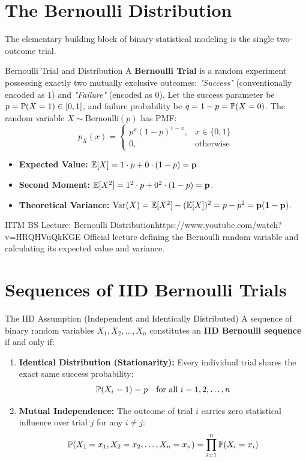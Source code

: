\section{The Bernoulli Distribution}

The elementary building block of binary statistical modeling is the single two-outcome trial.

\begin{definitionbox}{Bernoulli Trial and Distribution}
A \textbf{Bernoulli Trial} is a random experiment possessing exactly two mutually exclusive outcomes: \emph{"Success"} (conventionally encoded as $1$) and \emph{"Failure"} (encoded as $0$).
Let the success parameter be $p = \P(X = 1) \in [0, 1]$, and failure probability be $q = 1 - p = \P(X = 0)$.
The random variable $X \sim \text{Bernoulli}(p)$ has PMF:
$$p_X(x) = \begin{cases}
p^x (1 - p)^{1 - x}, & x \in \{0, 1\} \\
0, & \text{otherwise}
\end{cases}$$
\begin{itemize}
    \item \textbf{Expected Value:} $\E[X] = 1 \cdot p + 0 \cdot (1 - p) = \mathbf{p}$.
    \item \textbf{Second Moment:} $\E[X^2] = 1^2 \cdot p + 0^2 \cdot (1 - p) = \mathbf{p}$.
    \item \textbf{Theoretical Variance:} $\Var(X) = \E[X^2] - (\E[X])^2 = p - p^2 = \mathbf{p(1 - p)}$.
\end{itemize}
\end{definitionbox}

\begin{videocard}{IITM BS Lecture: Bernoulli Distribution}{https://www.youtube.com/watch?v=HRQHVuQkKGE}
Official lecture defining the Bernoulli random variable and calculating its expected value and variance.
\end{videocard}

\section{Sequences of IID Bernoulli Trials}

\begin{definitionbox}{The IID Assumption (Independent and Identically Distributed)}
A sequence of binary random variables $X_1, X_2, \dots, X_n$ constitutes an \textbf{IID Bernoulli sequence} if and only if:
\begin{enumerate}
    \item \textbf{Identical Distribution (Stationarity):} Every individual trial shares the exact same success probability:
    $$\P(X_i = 1) = p \quad \text{for all } i = 1, 2, \dots, n$$
    \item \textbf{Mutual Independence:} The outcome of trial $i$ carries zero statistical influence over trial $j$ for any $i \neq j$:
    $$\P(X_1 = x_1, X_2 = x_2, \dots, X_n = x_n) = \prod_{i=1}^n \P(X_i = x_i)$$
\end{enumerate}
\end{definitionbox}

